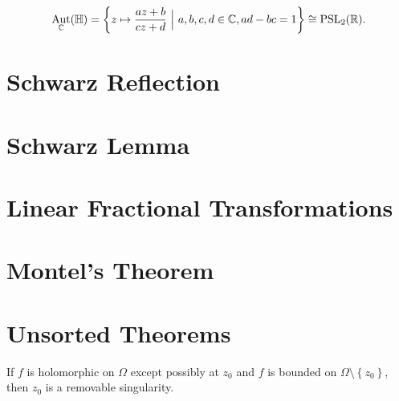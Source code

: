 \begin{theorem}[?]

\begin{align*}
\mathop{\mathrm{Aut}}_{\mathbb{C}}({\mathbb{H}}) = \left\{{ z \mapsto {az+b \over cz+d} {~\mathrel{\Big|}~}a,b,c,d\in {\mathbb{C}}, ad-bc=1 }\right\} \cong{\operatorname{PSL}}_2({\mathbb{R}})
.\end{align*}

\end{theorem}

\hypertarget{schwarz-reflection}{%
\section{Schwarz Reflection}\label{schwarz-reflection}}


\hypertarget{schwarz-lemma}{%
\section{Schwarz Lemma}\label{schwarz-lemma}}






\hypertarget{linear-fractional-transformations-1}{%
\section{Linear Fractional
Transformations}\label{linear-fractional-transformations-1}}

\hypertarget{montels-theorem}{%
\section{Montel's Theorem}\label{montels-theorem}}

\hypertarget{unsorted-theorems}{%
\section{Unsorted Theorems}\label{unsorted-theorems}}

\begin{theorem}

If \(f\) is holomorphic on \(\Omega\) except possibly at \(z_0\) and
\(f\) is bounded on \(\Omega\setminus\left\{{z_0}\right\}\), then
\(z_0\) is a removable singularity.

\end{theorem}

